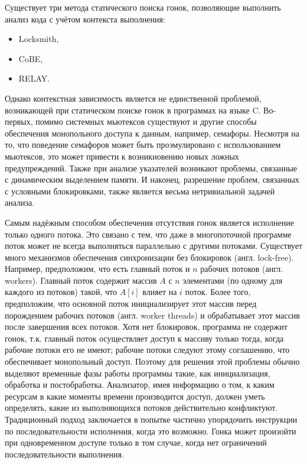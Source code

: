 

Существует три метода статического поиска гонок, позволяющие выполнить анализ кода с учётом контекста выполнения:

\begin{itemize}
  \item Locksmith,
  \item CoBE,
  \item RELAY.
\end{itemize}

Однако контекстная зависимость является не единственной проблемой, возникающей при статическом поиске гонок в программах на языке C. Во-первых, помимо системных мьютексов существуют и другие способы обеспечения монопольного доступа к данным, например, семафоры. Несмотря на то, что поведение семафоров может быть проэмулировано с использованием мьютексов, это может привести к возникновению новых ложных предупреждений. Также при анализе указателей возникают проблемы, связанные с динамическим выделением памяти. И наконец, разрешение проблем, связанных с условными блокировками, также является весьма нетривиальной задачей анализа.

Самым надёжным способом обеспечения отсутствия гонок является исполнение только одного потока. Это связано с тем, что даже в многопоточной программе поток может не всегда выполняться параллельно с другими потоками. Существует много механизмов обеспечения синхронизации без блокировок (англ. lock-free). Например, предположим, что есть главный поток и $n$ рабочих потоков (англ. workers). Главный поток содержит массив $A$ с $n$ элементами (по одному для каждого из потоков) такой, что $A[i]$ влияет на $i$  поток. Более того, предположим, что основной поток инициализирует этот массив перед порождением рабочих потоков (англ. worker threads) и обрабатывает этот массив после завершения всех потоков. Хотя нет блокировок, программа не содержит гонок, т.к. главный поток осуществляет доступ к массиву только тогда, когда рабочие потоки его не имеют; рабочие потоки следуют этому соглашению, что обеспечивает монопольный доступ. Поэтому для решения этой проблемы обычно выделяют временные фазы работы программы такие, как инициализация, обработка и постобработка. Анализатор, имея информацию о том, к каким ресурсам в какие моменты времени производится доступ, должен уметь определять, какие из выполняющихся потоков действительно конфликтуют. Традиционный подход заключается в попытке частично упорядочить инструкции по последовательности исполнения, когда это возможно. Гонка может произойти при одновременном доступе только в том случае, когда нет ограничений последовательности выполнения.

